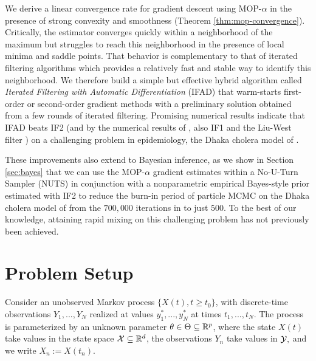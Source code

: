 \documentclass[9pt,twocolumn,pnasresearcharticle]{pnas-new}
\newcommand\arxiv[2]{#2} %
\begin{document}
We derive a linear convergence rate for gradient descent using MOP-$\alpha$ in the  presence of strong convexity and smoothness (Theorem \ref{thm:mop-convergence}).
Critically, the estimator converges quickly within a neighborhood of the maximum but struggles to reach this neighborhood in the presence of local minima and saddle points.
That behavior is complementary to that of iterated filtering algorithms \cite{ionides06-pnas,ionides15} which provides a relatively fast and stable way to identify this neighborhood.
We therefore build a simple but effective hybrid algorithm called {\it Iterated Filtering with Automatic Differentiation} (IFAD) that warm-starts first-order or second-order gradient methods with a preliminary solution obtained from a few rounds of iterated filtering.
Promising numerical results indicate that IFAD beats IF2 (and by the numerical results of \cite{ionides15}, also IF1 \cite{ionides06-pnas,ionides11} and the Liu-West filter \cite{liuwest01}) on a challenging problem in epidemiology, the Dhaka cholera model of \cite{king08}.

These improvements also extend to Bayesian inference, as we show in Section \ref{sec:bayes} that we can use the MOP-$\alpha$ gradient estimates within a No-U-Turn Sampler (NUTS) \cite{homan14} in conjunction with a nonparametric empirical Bayes-style prior estimated with IF2 to reduce the burn-in period of particle MCMC \cite{andrieu10} on the Dhaka cholera model of \cite{king08} from the $700,000$ iterations in \cite{fasiolo16} to just $500$. To the best of our knowledge, attaining rapid mixing on this challenging problem has not previously been achieved. 

\arxiv{}{\vspace*{-2mm}}
\section{Problem Setup}

Consider an unobserved Markov process $\{X(t),t  \geq t_0\}$, with discrete-time observations $Y_1,...,Y_N$ realized at values $y_1^*,...,y_N^*$ at times $t_1,..., t_N$.
The process is parameterized by an unknown parameter $\theta \in \Theta \subseteq \mathbb{R}^p$, where the state $X(t)$ take values in the state space ${\mathcal{X}} \subseteq \mathbb{R}^d$, the observations $Y_n$ take values in ${\mathcal{Y}},$ and we write $X_n := X(t_n)$. 

\end{document}

